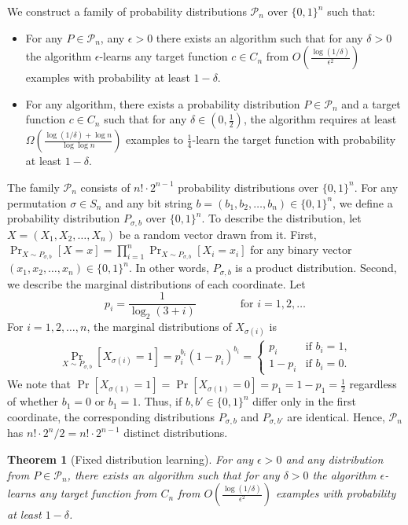 \documentclass[10pt]{article}
\newtheorem{theorem}[proposition]{Theorem}
\renewcommand{\P}{\mathcal{P}}
\begin{document}
We construct a family of probability distributions $\P_n$ over $\{0,1\}^n$ such that:
\begin{itemize}
\item For any $P \in \P_n$, any $\epsilon > 0$ there exists an algorithm such
that for any $\delta > 0$ the algorithm $\epsilon$-learns any target function $c
\in C_n$ from $O \left( \frac{\log(1/\delta)}{\epsilon^2} \right)$ examples with
probability at least $1-\delta$.

\item For any algorithm, there exists
a probability distribution $P \in \P_n$ and a target function $c \in C_n$
such that for any $\delta \in (0,\frac{1}{2})$, the algorithm requires
at least $\Omega(\frac{\log(1/\delta) + \log n}{\log \log n})$ examples to
$\frac{1}{4}$-learn the target function with probability at least $1-\delta$.
\end{itemize}

The family $\P_n$ consists of $n! \cdot 2^{n-1}$ probability distributions over
$\{0,1\}^n$. For any permutation $\sigma \in S_n$ and any bit string $b = (b_1,
b_2,\dots, b_n) \in \{0,1\}^n$, we define a probability distribution
$P_{\sigma,b}$ over $\{0,1\}^n$. To describe the distribution, let $X = (X_1,
X_2, \dots, X_n)$ be a random vector drawn from it. First, $\Pr_{X \sim
P_{\sigma,b}}[X = x] = \prod_{i=1}^n \Pr_{X \sim P_{\sigma,b}}[X_i = x_i]$ for
any binary vector $(x_1, x_2, \dots, x_n) \in \{0,1\}^n$. In other words,
$P_{\sigma,b}$ is a product distribution. Second, we describe the marginal
distributions of each coordinate. Let
$$
p_i = \frac{1}{\log_2(3 + i)} \qquad \qquad \text{for $i=1,2,\dots$}
$$
For $i=1,2,\dots,n$, the marginal distributions of $X_{\sigma(i)}$ is
\begin{align*}
\Pr_{X \sim P_{\sigma,b}}[X_{\sigma(i)} = 1] = p_i^{b_i} (1 - p_i)^{b_i} =
\begin{cases}
p_i & \text{if $b_i = 1$,} \\
1 - p_i & \text{if $b_i = 0$.}
\end{cases}
\end{align*}
We note that $\Pr[X_{\sigma(1)} = 1] = \Pr[X_{\sigma(1)} = 0] = p_1 = 1 - p_1 =
\frac{1}{2}$ regardless of whether $b_1 = 0$ or $b_1 = 1$. Thus, if $b,b' \in \{0,1\}^n$
differ only in the first coordinate, the corresponding distributions $P_{\sigma,b}$
and $P_{\sigma,b'}$ are identical. Hence, $\P_n$ has $n! \cdot 2^n / 2 = n! \cdot 2^{n-1}$
distinct distributions.

\begin{theorem}[Fixed distribution learning]
For any $\epsilon > 0$ and any distribution from $P \in \P_n$,
there exists an algorithm such that for any $\delta > 0$
the algorithm $\epsilon$-learns any target function
from $C_n$ from $O \left( \frac{\log(1/\delta)}{\epsilon^2} \right)$
examples with probability at least $1 - \delta$.
\end{theorem}
\end{document}

